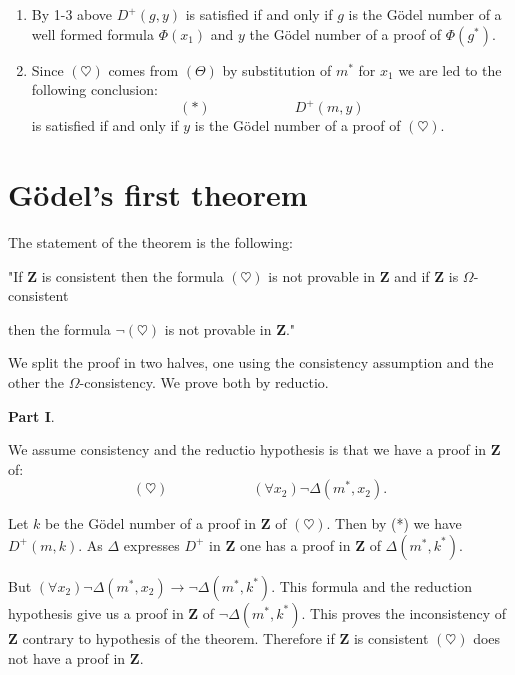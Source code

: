 \documentclass[12pt]{article}
\begin{document}
\begin{enumerate}
\item By 1-3 above $D^{+} (g, y)$ is satisfied if and only if $g$ is the G\"{o}del number of a well formed formula $\Phi (x_1)$ and $y$ the G\"{o}del number of a proof of $\Phi (g^*).$

\item Since $(\heartsuit)$ comes from $(\Theta)$ by substitution of $m^*$ for $x_1$ we are led to the following conclusion:
$$(*) \hspace{6em} D^{+} (m, y)$$
is satisfied if and only if $y$ is the G\"{o}del number of a proof of $(\heartsuit).$
\end{enumerate}

\section{G\"{o}del's first theorem}\normalsize

The statement of the theorem is the following:
\begin{center}
"If $\textbf{Z}$ is consistent then the formula $(\heartsuit)$ is not provable in $\textbf{Z}$ and if $\textbf{Z}$ is $\Omega$-consistent 

then the formula $\neg (\heartsuit)$ is not provable in $\textbf{Z}$."
\end{center}

We split the proof in two halves, one using the consistency assumption and the other the $\Omega$-consistency. We prove both by reductio.

\medskip
\begin{large}
\textbf{Part I}.
\end{large}

We assume consistency and the reductio hypothesis is that we have a proof in $\textbf{Z}$ of: 
$$(\heartsuit) \hspace{6em} (\forall x_2) \neg \Delta (m^*, x_2).$$

Let $k$ be the G\"{o}del number of a proof in $\textbf{Z}$ of $(\heartsuit)$. Then by (*) we have $D^{+} (m, k)$. As $\Delta$ expresses $D^{+}$ in $\textbf{Z}$ one has a proof in $\textbf{Z}$ of $\Delta (m^*, k^*).$ 

But $(\forall x_2) \neg \Delta (m^*, x_2) \rightarrow \neg \Delta (m^*, k^*)$. This formula and the reduction hypothesis give us a proof in $\textbf{Z}$ of $\neg \Delta (m^*, k^*)$. This proves the inconsistency of $\textbf{Z}$ contrary to hypothesis of the theorem. Therefore if $\textbf{Z}$ is consistent $(\heartsuit)$ does not have a proof in $\textbf{Z}$.
\end{document}
